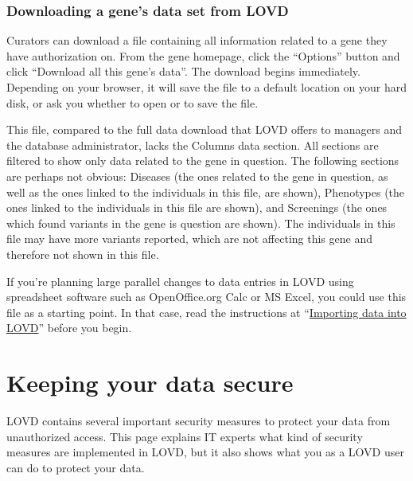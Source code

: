 \documentclass[a4paper,oneside,openany,12pt]{memoir}
\renewenvironment{leftbar}[1][\hsize]
{%
    \def\FrameCommand
    {%
        {\color{LOVDdark}\vrule width 3pt \hspace{5pt}}%
        \colorbox{LOVDlight}%
    }%
    \MakeFramed{\hsize#1\advance\hsize-\width\FrameRestore}%
}
{\endMakeFramed}
\begin{document}
\subsection{Downloading a gene's data set from LOVD}
Curators can download a file containing all information related to a gene they have authorization on.
From the gene homepage, click the ``Options'' button and click ``Download all this gene's data''.
The download begins immediately.
Depending on your browser, it will save the file to a default location on your hard disk, or ask you whether to open or to save the file.

This file, compared to the full data download that LOVD offers to managers and the database administrator, lacks the Columns data section.
All sections are filtered to show only data related to the gene in question.
The following sections are perhaps not obvious: Diseases (the ones related to the gene in question, as well as the ones linked to the individuals in this file, are shown),
 Phenotypes (the ones linked to the individuals in this file are shown), and Screenings (the ones which found variants in the gene is question are shown).
The individuals in this file may have more variants reported, which are not affecting this gene and therefore not shown in this file.

If you're planning large parallel changes to data entries in LOVD using spreadsheet software such as OpenOffice.org Calc or MS Excel, you could use this file as a starting point.
In that case, read the instructions at ``\hyperlink{sec:download_importing_data}{Importing data into LOVD}'' before you begin.
\clearpage %










\hypertarget{chap:security}{}
\chapter{Keeping your data secure}
LOVD contains several important security measures to protect your data from unauthorized access.
This page explains IT experts what kind of security measures are implemented in LOVD, but it also shows what you as a LOVD user can do to protect your data.
\end{document}
